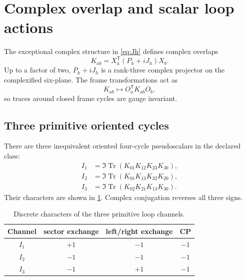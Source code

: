 \documentclass[11pt]{article}
\newcommand{\Tr}{\operatorname{Tr}}
\begin{document}
\section{Complex overlap and scalar loop actions}
\label{sec:loops}

The exceptional complex structure in \cref{eq:Jh} defines complex overlaps
\begin{equation}
  K_{ab}=X_a^{\mathsf T}(P_h+iJ_h)X_b.
  \label{eq:Kab}
\end{equation}
Up to a factor of two, $P_h+iJ_h$ is a rank-three complex projector on the complexified six-plane.  The frame transformations act as
\begin{equation}
  K_{ab}\mapsto O_a^{\mathsf T}K_{ab}O_b,
\end{equation}
so traces around closed frame cycles are gauge invariant.

\subsection{Three primitive oriented cycles}

There are three inequivalent oriented four-cycle pseudoscalars in the declared class:
\begin{align}
 I_1&=\Im\Tr(K_{01}K_{12}K_{23}K_{30}),\nonumber\\
 I_2&=\Im\Tr(K_{01}K_{13}K_{32}K_{20}),\nonumber\\
 I_3&=\Im\Tr(K_{02}K_{21}K_{13}K_{30}).
 \label{eq:loops}
\end{align}
Their characters are shown in \cref{tab:loop-characters}.  Complex conjugation reverses all three signs.

\begin{table}[t]
\centering
\caption{Discrete characters of the three primitive loop channels.}
\label{tab:loop-characters}
\begin{tabular}{@{}cccc@{}}
\toprule
Channel & sector exchange & left/right exchange & CP \\
\midrule
$I_1$ & $+1$ & $-1$ & $-1$ \\
$I_2$ & $-1$ & $-1$ & $-1$ \\
$I_3$ & $-1$ & $+1$ & $-1$ \\
\bottomrule
\end{tabular}
\end{table}
\end{document}
